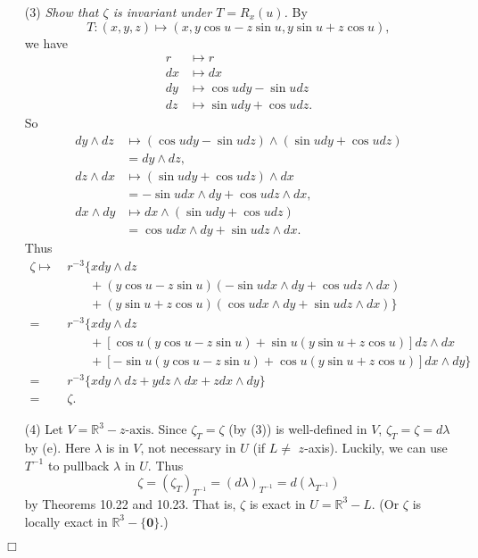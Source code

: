 \documentclass{article}
\begin{document}
\begin{enumerate}
\item[(3)]
  \emph{Show that $\zeta$ is invariant under $T = R_x(u)$.}
  By
  \[
    T: (x,y,z) \mapsto (x, y \cos u - z \sin u, y \sin u + z \cos u),
  \]
  we have
  \begin{align*}
    r &\mapsto r \\
    dx &\mapsto dx \\
    dy &\mapsto \cos u dy - \sin u dz \\
    dz &\mapsto \sin u dy + \cos u dz.
  \end{align*}
  So
  \begin{align*}
    dy \wedge dz
      &\mapsto (\cos u dy - \sin u dz) \wedge (\sin u dy + \cos u dz) \\
      &= dy \wedge dz, \\
    dz \wedge dx
      &\mapsto (\sin u dy + \cos u dz) \wedge dx \\
      &= -\sin u dx \wedge dy + \cos u dz \wedge dx, \\
    dx \wedge dy
      &\mapsto dx \wedge (\sin u dy + \cos u dz) \\
      &= \cos u dx \wedge dy + \sin u dz \wedge dx.
  \end{align*}
  Thus
  \begin{align*}
    \zeta
    \mapsto& \:
      r^{-3} \{ x dy \wedge dz \\
      &\qquad + (y \cos u - z \sin u)(-\sin u dx \wedge dy + \cos u dz \wedge dx) \\
      &\qquad + (y \sin u + z \cos u)(\cos u dx \wedge dy + \sin u dz \wedge dx) \} \\
    =& \:
      r^{-3} \{ x dy \wedge dz \\
      &\qquad + [\cos u(y \cos u - z \sin u) + \sin u(y \sin u + z \cos u)] dz \wedge dx \\
      &\qquad + [-\sin u(y \cos u - z \sin u) + \cos u(y \sin u + z \cos u)] dx \wedge dy \} \\
    =& \:
      r^{-3} \{ x dy \wedge dz + y dz \wedge dx + z dx \wedge dy \} \\
    =& \: \zeta.
  \end{align*}

\item[(4)]
  Let $V = \mathbb{R}^3 - \text{$z$-axis}$.
  Since $\zeta_T = \zeta$ (by (3)) is well-defined in $V$,
  $\zeta_T = \zeta = d\lambda$ by (e).
  Here $\lambda$ is in $V$, not necessary in $U$ (if $L \neq$ $z$-axis).
  Luckily, we can use $T^{-1}$ to pullback $\lambda$ in $U$.
  Thus
  \[
    \zeta
    = (\zeta_T)_{T^{-1}}
    = (d\lambda)_{T^{-1}}
    = d(\lambda_{T^{-1}})
  \]
  by Theorems 10.22 and 10.23.
  That is, $\zeta$ is exact in $U = \mathbb{R}^3 - L$.
  (Or $\zeta$ is locally exact in $\mathbb{R}^3 - \{ \mathbf{0} \}$.)
\end{enumerate}
$\Box$ \\\\
\end{document}

